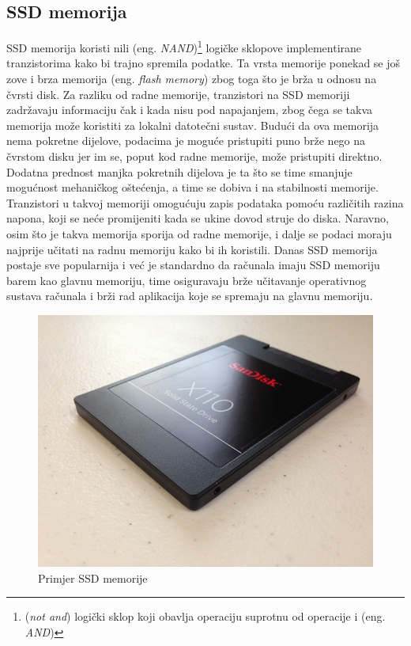\documentclass[times, utf8, zavrsni, square]{fer}
\begin{document}
\subsection{SSD memorija}
SSD memorija koristi nili (eng. \textit{NAND})\footnote{(\textit{not and}) logički sklop koji obavlja operaciju suprotnu od operacije i (eng. \textit{AND})} logičke sklopove implementirane tranzistorima kako bi trajno spremila podatke. 
Ta vrsta memorije ponekad se još zove i brza memorija (eng. \textit{flash memory}) zbog toga što je brža u odnosu na čvrsti disk.
Za razliku od radne memorije, tranzistori na SSD memoriji zadržavaju informaciju čak i kada nisu pod napajanjem, zbog čega se takva memorija može koristiti za lokalni datotečni sustav. 
Budući da ova memorija nema pokretne dijelove, podacima je moguće pristupiti puno brže nego na čvrstom disku jer im se, poput kod radne memorije, može pristupiti direktno.
Dodatna prednost manjka pokretnih dijelova je ta što se time smanjuje mogućnost mehaničkog oštećenja, a time se dobiva i na stabilnosti memorije.
Tranzistori u takvoj memoriji omogućuju zapis podataka pomoću različitih razina napona, koji se neće promijeniti kada se ukine dovod struje do diska\cite{ssd}.
Naravno, osim što je takva memorija sporija od radne memorije, i dalje  se podaci moraju najprije učitati na radnu memoriju kako bi ih koristili.
Danas SSD memorija postaje sve popularnija i već je standardno da računala imaju SSD memoriju barem kao glavnu memoriju, time osiguravaju brže učitavanje operativnog sustava računala i brži rad aplikacija koje se spremaju na glavnu memoriju.
\begin{figure}[h!]
    \centering
    \includegraphics[width=1\textwidth]{ssd}
    \caption{Primjer SSD memorije}
    \label{fig:ssdImage}
\end{figure} 
\FloatBarrier
\end{document}
